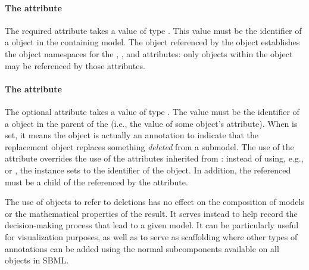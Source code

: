 \paragraph{The \fixttspace{} attribute}
\label{replacedelement-submodelref}

The required attribute  takes a value of type
.  This value must be the identifier of a \Submodel
object in the containing model.  The \Model object referenced by the
\Submodel object establishes the object namespaces for the
, ,  and 
attributes: only objects within the \Model object may be referenced by
those attributes.


\paragraph{The \fixttspace{} attribute}
\label{replacedelement-deletion}

The optional attribute  takes a value of type
.  The value must be the identifier of a \Deletion
object in the parent \Model of the \ReplacedElement (i.e., the value of
some \Deletion object's  attribute).  When  is
set, it means the \ReplacedElement object is actually an annotation to
indicate that the replacement object replaces something \emph{deleted}
from a submodel.  The use of the  attribute overrides
the use of the attributes inherited from \SBaseRef: instead of using,
e.g.,  or , the \ReplacedElement instance
sets  to the identifier of the \Deletion object.  In
addition, the referenced \Deletion must be a child of the \Submodel
referenced by the  attribute.

The use of \ReplacedElement objects to refer to deletions has no effect
on the composition of models or the mathematical properties of the
result.  It serves instead to help record the decision-making process
that lead to a given model.  It can be particularly useful for
visualization purposes, as well as to serve as scaffolding where other
types of annotations can be added using the normal \Annotation
subcomponents available on all \SBase objects in SBML.

